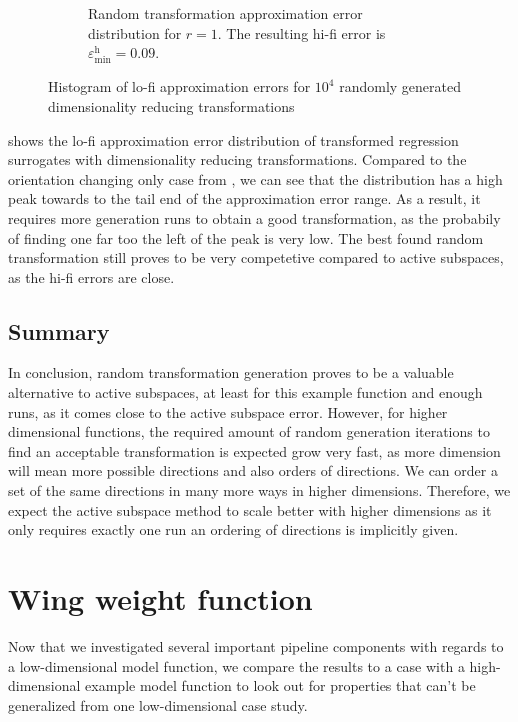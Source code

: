 \documentclass[
  a4paper,  %
  twoside,  %
  bibliography=totoc,
  headsepline,
  cleardoublepage=empty,
  parskip=half,
  draft=false
]{scrbook}
\begin{document}
\begin{mdframed}[style=style]
\begin{figure}[H]
\begin{subfigure}{.5\textwidth}
  \caption{Random transformation approximation error distribution for $r=1$. The resulting hi-fi error is $\varepsilon^\mathrm{h}_{\mathrm{min}}=0.09$.}
\vspace{3mm}
\label{fig:ishigami_hist_1}
\end{subfigure}
\delimit
\caption{Histogram of lo-fi approximation errors for $10^4$ randomly generated dimensionality reducing transformations}
\label{fig:ishigami_hist_12}
\end{figure}
\end{mdframed}
%
 shows the lo-fi approximation error distribution of transformed regression surrogates with dimensionality reducing transformations.
Compared to the orientation changing only case from , we can see that the distribution has a high peak towards to the tail end of the approximation error range.
As a result, it requires more generation runs to obtain a good transformation, as the probabily of finding one far too the left of the peak is very low.
The best found random transformation still proves to be very competetive compared to active subspaces, as the hi-fi errors are close.

\subsection{Summary}

In conclusion, random transformation generation proves to be a valuable alternative to active subspaces, at least for this example function and enough runs, as it comes close to the active subspace error.
However, for higher dimensional functions, the required amount of random generation iterations to find an acceptable transformation is expected grow very fast, as more dimension will mean more possible directions and also orders of directions.
We can order a set of the same directions in many more ways in higher dimensions.
Therefore, we expect the active subspace method to scale better with higher dimensions as it only requires exactly one run an ordering of directions is implicitly given.

\section{Wing weight function}

Now that we investigated several important pipeline components with regards to a low-dimensional model function, we compare the results to a case with a high-dimensional example model function to look out for properties that can't be generalized from one low-dimensional case study.
\end{document}
